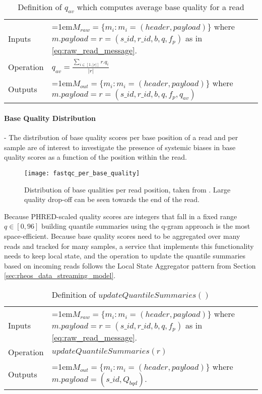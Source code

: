 \bgroup
\def\arraystretch{1.5}
\begin{table}[!ht]
    \caption{Definition of $q_{av}$ which computes average base quality for a read}
    \label{tab:op_average_base_quality}
    {\begin{tabular}{l|p{12cm}}
    \toprule
    Inputs & \hangindent=1em$M_{raw} = \{m_i: m_i = (header, payload)\}$ where $m.payload = r = (s\_id, r\_id, b, q, f_p)$ as in \ref{eq:raw_read_message}.\\
    \cline{2-2}
    Operation & $q_{av} = \frac{\sum_{i \in [1,|r|]} r.q_i}{|r|}$\\
    \cline{2-2}
    {Outputs} & \hangindent=1em$M_{out} = \{m_i: m_i = (header, payload)\}$ where $m.payload = r = (s\_id, r\_id, b, q, f_p, q_{av})$\\
    \bottomrule
    \end{tabular}}
\end{table}
\egroup


\paragraph{Base Quality Distribution} - The distribution of base quality scores per base position of a read and per sample are of interest to investigate the presence of systemic biases in base quality scores as a function of the position within the read.

\begin{figure}[H]
    \texttt{[image: fastqc\_per\_base\_quality]}
    \centering
    \caption {Distribution of base qualities per read position, taken from \autocite{fastqc}. Large quality drop-off can be seen towards the end of the read.}
    \label{fig:main_body_fastqc_per_base_quality}
\end{figure} 

Because PHRED-scaled quality scores are integers that fall in a fixed range $q \in [0,96]$ building quantile summaries using the q-gram\autocite{shrivastava2004medians} approach is the most space-efficient. Because base quality scores need to be aggregated over many reads and tracked for many samples, a service that implements this functionality needs to keep local state, and the operation to update the quantile summaries based on incoming reads follows the Local State Aggregator pattern from Section \ref{sec:rheos_data_streaming_model}. 

\bgroup
\def\arraystretch{1.5}
\begin{table}[!ht]
    \caption{Definition of $updateQuantileSummaries()$}
    \label{tab:op_update_quantile_summaries}
    {\begin{tabular}{l|p{12cm}}
    \toprule
    Inputs & \hangindent=1em$M_{raw} = \{m_i: m_i = (header, payload)\}$ where $m.payload = r = (s\_id, r\_id, b, q, f_p)$ as in \ref{eq:raw_read_message}. \\
    \cline{2-2}
    Operation & $updateQuantileSummaries(r)$\\
    \cline{2-2}
    {Outputs} & \hangindent=1em$M_{out} = \{m_i: m_i = (header, payload)\}$ where $m.payload = (s\_id, Q_{bqd})$.\\
    \bottomrule
    \end{tabular}}
\end{table}
\egroup

